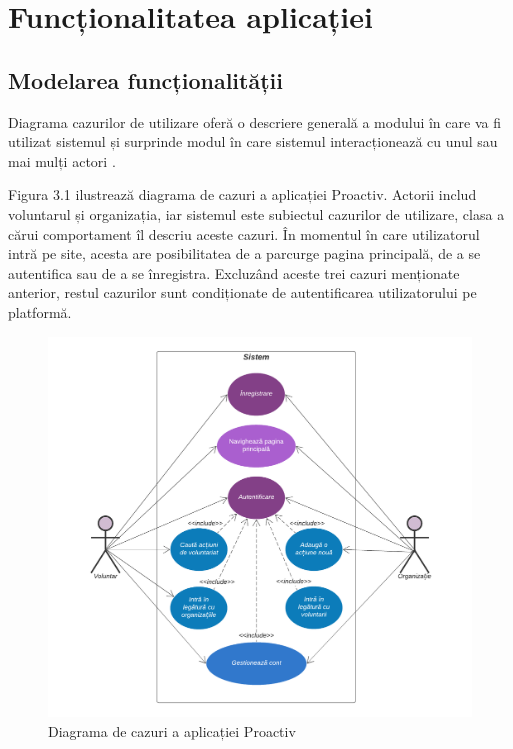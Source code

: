 \documentclass[12pt,a4paper]{report}
\begin{document}
\chapter{Funcționalitatea aplicației}
\section{Modelarea funcționalității}
\par
Diagrama cazurilor de utilizare oferă o descriere generală a modului în care va fi utilizat sistemul și surprinde modul în care sistemul interacționează cu unul sau mai mulți actori \cite{usecases}.
\\
\par
Figura 3.1 ilustrează diagrama de cazuri a aplicației Proactiv. Actorii includ voluntarul și organizația, iar sistemul este subiectul cazurilor de utilizare, clasa a cărui comportament îl descriu aceste cazuri. 
În momentul în care utilizatorul intră pe site, acesta are posibilitatea de a parcurge pagina principală, de a se autentifica sau de a se înregistra. Excluzând aceste trei cazuri menționate anterior, restul cazurilor sunt condiționate de autentificarea utilizatorului pe platformă.
\\
\begin{figure}[h!]
  \centering
    \includegraphics[width=0.7\linewidth]{./imagini/UseCase.png}
    \caption{Diagrama de cazuri a aplicației Proactiv}
\end{figure}
\end{document}

